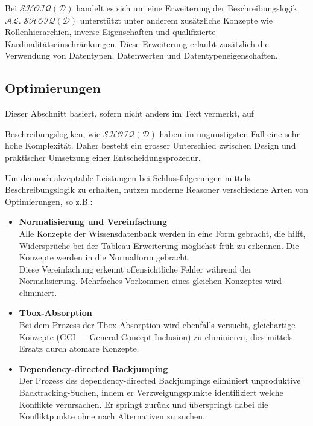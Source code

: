 Bei $\mathcal{SHOIQ}(\mathcal{D})$ handelt es sich um eine Erweiterung der Beschreibungslogik $\mathcal{AL}$. $\mathcal{SHOIQ}(\mathcal{D})$ unterstützt unter anderem zusätzliche Konzepte wie Rollenhierarchien, inverse Eigenschaften und qualifizierte Kardinalitätseinschränkungen. Diese Erweiterung erlaubt zusätzlich die Verwendung von Datentypen, Datenwerten und Datentypeneigenschaften.~\cite{wiki:desclog}

\subsection{Optimierungen}
\label{subsection:inferenz_pellet_opti}
Dieser Abschnitt basiert, sofern nicht anders im Text vermerkt, auf~\cite[S. 16 - 19]{sirin:pellet05}

Beschreibungslogiken, wie $\mathcal{SHOIQ}(\mathcal{D})$ haben im ungünstigsten Fall eine sehr hohe Komplexität. Daher besteht ein grosser Unterschied zwischen Design und praktischer Umsetzung einer Entscheidungsprozedur.

Um dennoch akzeptable Leistungen bei Schlussfolgerungen mittels Beschreibungslogik zu erhalten, nutzen moderne Reasoner verschiedene Arten von Optimierungen, so z.B.:

\begin{itemize}
    \item \textbf{Normalisierung und Vereinfachung}\\
        Alle Konzepte der Wissensdatenbank werden in eine Form gebracht, die hilft, Widersprüche bei der Tableau-Erweiterung möglichst früh zu erkennen. Die Konzepte werden in die Normalform gebracht.\\
        Diese Vereinfachung erkennt offensichtliche Fehler während der Normalisierung. Mehrfaches Vorkommen eines gleichen Konzeptes wird eliminiert.

    \item \textbf{Tbox-Absorption}\\
        Bei dem Prozess der Tbox-Absorption wird ebenfalls versucht, gleichartige Konzepte (GCI --- General Concept Inclusion) zu eliminieren, dies mittels Ersatz durch atomare Konzepte.

    \item \textbf{Dependency-directed Backjumping}\\
        Der Prozess des dependency-directed Backjumpings eliminiert unproduktive Backtracking-Suchen, indem er Verzweigungspunkte identifiziert welche Konflikte verursachen. Er springt zurück und überspringt dabei die Konfliktpunkte ohne nach Alternativen zu suchen.
\end{itemize}

